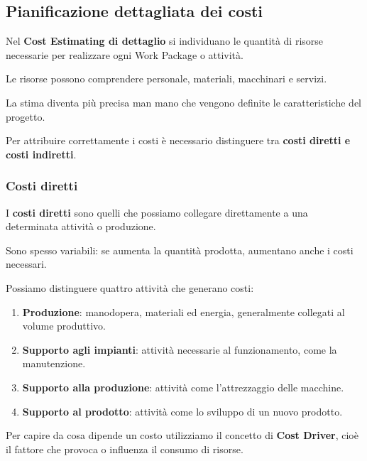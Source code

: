 \subsection{Pianificazione dettagliata dei costi}

\noindent Nel \textbf{Cost Estimating di dettaglio}
si individuano le quantità di risorse necessarie
per realizzare ogni Work Package o attività.

\noindent Le risorse possono comprendere
personale, materiali, macchinari e servizi.

\medskip

\noindent La stima diventa più precisa
man mano che vengono definite le caratteristiche
del progetto.

\noindent Per attribuire correttamente i costi
è necessario distinguere tra
\textbf{costi diretti e costi indiretti}.

\subsubsection*{Costi diretti}

\noindent I \textbf{costi diretti} sono quelli
che possiamo collegare direttamente
a una determinata attività o produzione.

\noindent Sono spesso variabili:
se aumenta la quantità prodotta,
aumentano anche i costi necessari.

\medskip

\noindent Possiamo distinguere quattro attività
che generano costi:

\begin{enumerate}
    \item \textbf{Produzione}: manodopera,
    materiali ed energia, generalmente collegati
    al volume produttivo.

    \item \textbf{Supporto agli impianti}:
    attività necessarie al funzionamento,
    come la manutenzione.

    \item \textbf{Supporto alla produzione}:
    attività come l'attrezzaggio delle macchine.

    \item \textbf{Supporto al prodotto}:
    attività come lo sviluppo di un nuovo prodotto.
\end{enumerate}

\noindent Per capire da cosa dipende un costo
utilizziamo il concetto di \textbf{Cost Driver},
cioè il fattore che provoca o influenza
il consumo di risorse.

